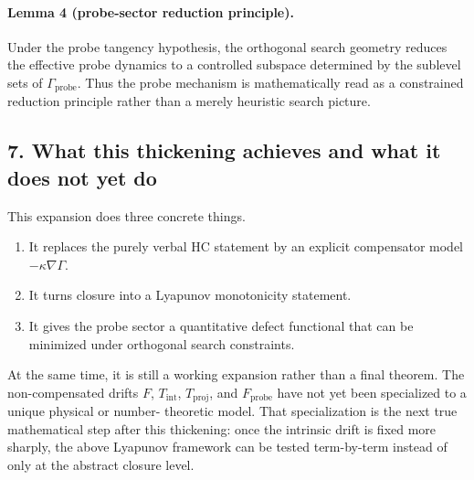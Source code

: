 \paragraph{Lemma 4 (probe-sector reduction principle).}
Under the probe tangency hypothesis, the orthogonal search geometry reduces the
effective probe dynamics to a controlled subspace determined by the sublevel
sets of $\Gamma_{\mathrm{probe}}$. Thus the probe mechanism is mathematically read
as a constrained reduction principle rather than a merely heuristic search
picture.

\subsection*{7. What this thickening achieves and what it does not yet do}
This expansion does three concrete things.
\begin{enumerate}
    \item It replaces the purely verbal HC statement by an explicit compensator
    model $-\kappa\nabla\Gamma$.
    \item It turns closure into a Lyapunov monotonicity statement.
    \item It gives the probe sector a quantitative defect functional that can be
    minimized under orthogonal search constraints.
\end{enumerate}
At the same time, it is still a working expansion rather than a final theorem.
The non-compensated drifts $F$, $T_{\mathrm{int}}$, $T_{\mathrm{proj}}$, and
$F_{\mathrm{probe}}$ have not yet been specialized to a unique physical or number-
theoretic model. That specialization is the next true mathematical step after
this thickening: once the intrinsic drift is fixed more sharply, the above
Lyapunov framework can be tested term-by-term instead of only at the abstract
closure level.


